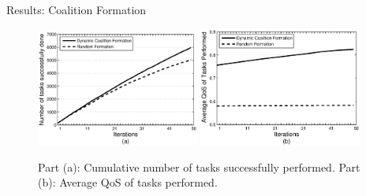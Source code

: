 \documentclass{beamer}
\begin{document}
\begin{frame}{Results: Coalition Formation}
    \begin{figure}[!t]
        \centering
        \includegraphics[width=2.1in]{figures/s2_task_done.eps}
        \includegraphics[width=2.1in]{figures/s2_task_qos.eps}
        \caption{Part (a): Cumulative number of tasks successfully performed. Part
        (b): Average QoS of tasks performed.} \label{performancemany}
    \end{figure}
\end{frame}
\end{document}
